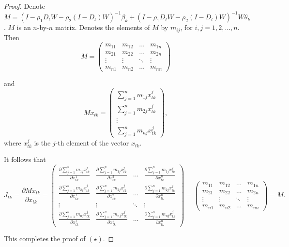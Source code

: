 \documentclass[11pt,a4paper]{amsart}
\theoremstyle{plain}
\theoremstyle{definition}
\begin{document}
\begin{proof}

Denote $M =  (I-\rho_{1}D_{t}W-\rho_{2}(I-D_{t})W)^{-1}\beta_{k} + (I-\rho_{1}D_{t}W-\rho_{2}(I-D_{t})W)^{-1}W \theta_{k}$. $M$ is an $n$-by-$n$ matrix. Denotes the elements of $M$ by $m_{ij}$, for $i, j = 1, 2, \dots, n$. Then 
\[	M = \begin{pmatrix}
	m_{11} & m_{12} & \dots & m_{1n}\\
	m_{21} & m_{22} & \dots & m_{2n}\\
	\vdots & \vdots & \ddots & \vdots \\
	m_{n1} & m_{n2} &\dots & m_{nn}
\end{pmatrix}	\]

and
\[	Mx_{tk} = \begin{pmatrix}
	\sum_{j=1}^{n} m_{1j}x_{tk}^{j} \\
	\sum_{j=1}^{n} m_{2j}x_{tk}^{j} \\
	\vdots\\
	\sum_{j=1}^{n} m_{nj}x_{tk}^{j} 
\end{pmatrix},	\]
where $x_{tk}^{j}$ is the $j$-th element of the vector $x_{tk}$.

It follows that 
\[	J_{tk} = \frac{\partial M x_{tk}}{\partial x_{tk}} = \begin{pmatrix}
	\frac{\partial \sum_{j=1}^{n} m_{1j}x_{tk}^{j} }{\partial x_{tk}^{1}} & 	\frac{\partial \sum_{j=1}^{n} m_{1j}x_{tk}^{j} }{\partial x_{tk}^{2}} & \dots &  	\frac{\partial \sum_{j=1}^{n} m_{1j}x_{tk}^{j} }{\partial x_{tk}^{n}} \\
	\frac{\partial \sum_{j=1}^{n} m_{2j}x_{tk}^{j}}{\partial x_{tk}^{1}} & 	\frac{\partial \sum_{j=1}^{n} m_{2j}x_{tk}^{j}}{\partial x_{tk}^{2}} & \dots & 	\frac{\partial \sum_{j=1}^{n} m_{2j}x_{tk}^{j}}{\partial x_{tk}^{n}} \\
	\vdots & \vdots & \ddots & \vdots \\
	\frac{\partial \sum_{j=1}^{n} m_{nj}x_{tk}^{j}}{\partial x_{tk}^{1}} & \frac{\partial \sum_{j=1}^{n} m_{nj}x_{tk}^{j}}{\partial x_{tk}^{2}}  &  \dots & \frac{\partial \sum_{j=1}^{n} m_{nj}x_{tk}^{j}}{\partial x_{tk}^{n} }
\end{pmatrix} =  \begin{pmatrix}
m_{11} & m_{12} & \dots & m_{1n}\\
m_{21} & m_{22} & \dots & m_{2n}\\
\vdots & \vdots & \ddots & \vdots \\
m_{n1} & m_{n2} &\dots & m_{nn}
\end{pmatrix} = M.	\]

This completes the proof of $(\star)$. 

\end{proof}
\end{document}
